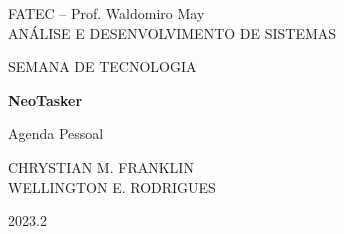 \documentclass[a4paper,12pt]{article}
\begin{document}
\begin{titlingpage}
    \begin{center}
        {\large
            {\Huge
                FATEC -- Prof. Waldomiro May
            }\\
            ANÁLISE E DESENVOLVIMENTO DE SISTEMAS

            \vspace{1cm}
            SEMANA DE TECNOLOGIA

            \vspace{6cm}
            {\Huge
                \textbf{NeoTasker}
            }

            Agenda Pessoal

            \vspace{2cm}
            CHRYSTIAN M. FRANKLIN \\
            WELLINGTON E. RODRIGUES

            \vspace{8cm}
            2023.2
        }
    \end{center}
\end{titlingpage}
\end{document}
